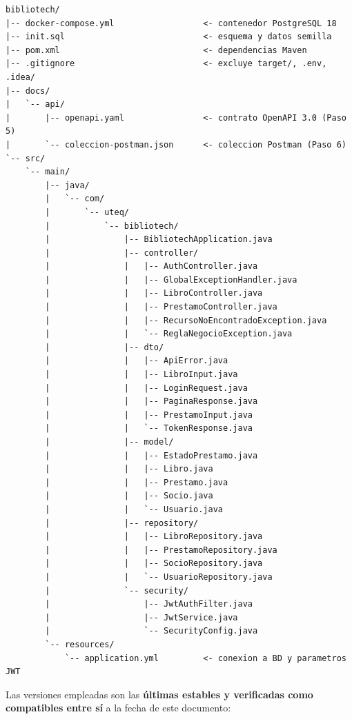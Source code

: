 \documentclass[11pt,a4paper]{article}
\begin{document}
\begin{lstlisting}[numbers=none,caption={Estructura final del proyecto \texttt{bibliotech}}]
bibliotech/
|-- docker-compose.yml                  <- contenedor PostgreSQL 18
|-- init.sql                            <- esquema y datos semilla
|-- pom.xml                             <- dependencias Maven
|-- .gitignore                          <- excluye target/, .env, .idea/
|-- docs/
|   `-- api/
|       |-- openapi.yaml                <- contrato OpenAPI 3.0 (Paso 5)
|       `-- coleccion-postman.json      <- coleccion Postman (Paso 6)
`-- src/
    `-- main/
        |-- java/
        |   `-- com/
        |       `-- uteq/
        |           `-- bibliotech/
        |               |-- BibliotechApplication.java
        |               |-- controller/
        |               |   |-- AuthController.java
        |               |   |-- GlobalExceptionHandler.java
        |               |   |-- LibroController.java
        |               |   |-- PrestamoController.java
        |               |   |-- RecursoNoEncontradoException.java
        |               |   `-- ReglaNegocioException.java
        |               |-- dto/
        |               |   |-- ApiError.java
        |               |   |-- LibroInput.java
        |               |   |-- LoginRequest.java
        |               |   |-- PaginaResponse.java
        |               |   |-- PrestamoInput.java
        |               |   `-- TokenResponse.java
        |               |-- model/
        |               |   |-- EstadoPrestamo.java
        |               |   |-- Libro.java
        |               |   |-- Prestamo.java
        |               |   |-- Socio.java
        |               |   `-- Usuario.java
        |               |-- repository/
        |               |   |-- LibroRepository.java
        |               |   |-- PrestamoRepository.java
        |               |   |-- SocioRepository.java
        |               |   `-- UsuarioRepository.java
        |               `-- security/
        |                   |-- JwtAuthFilter.java
        |                   |-- JwtService.java
        |                   `-- SecurityConfig.java
        `-- resources/
            `-- application.yml         <- conexion a BD y parametros JWT
\end{lstlisting}

Las versiones empleadas son las \textbf{últimas estables y verificadas como compatibles entre sí} a la fecha de este documento:
\end{document}
